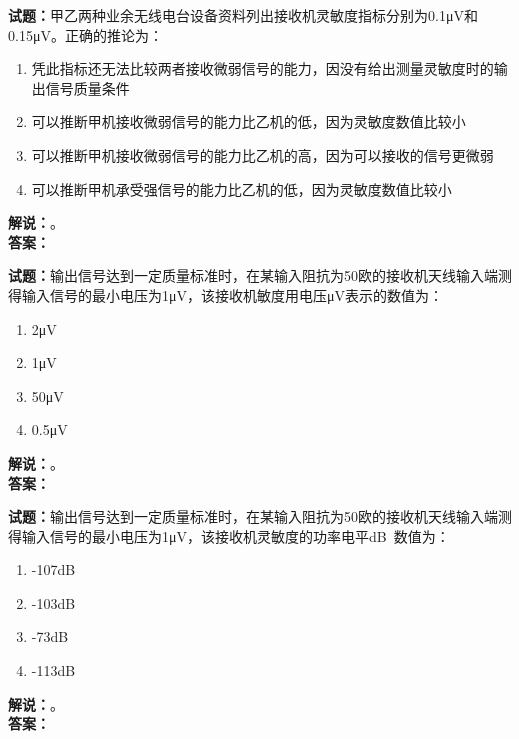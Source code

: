 \documentclass{ctexbook}
\begin{document}
\vspace{\baselineskip}

\noindent\textbf{试题：}甲乙两种业余无线电台设备资料列出接收机灵敏度指标分别为0.1μV和0.15μV。正确的推论为：
\begin{enumerate}[leftmargin=3em]
  \item 凭此指标还无法比较两者接收微弱信号的能力，因没有给出测量灵敏度时的输出信号质量条件
  \item 可以推断甲机接收微弱信号的能力比乙机的低，因为灵敏度数值比较小
  \item 可以推断甲机接收微弱信号的能力比乙机的高，因为可以接收的信号更微弱
  \item 可以推断甲机承受强信号的能力比乙机的低，因为灵敏度数值比较小
\end{enumerate}
\noindent\textbf{解说：}\textbf{}。\\\noindent\textbf{答案：}

\vspace{\baselineskip}

\noindent\textbf{试题：}输出信号达到一定质量标准时，在某输入阻抗为50欧的接收机天线输入端测得输入信号的最小电压为1μV，该接收机敏度用电压μV表示的数值为：
\begin{enumerate}[leftmargin=3em]
  \item 2μV
  \item 1μV
  \item 50μV
  \item 0.5μV
\end{enumerate}
\noindent\textbf{解说：}\textbf{}。\\\noindent\textbf{答案：}

\vspace{\baselineskip}

\noindent\textbf{试题：}输出信号达到一定质量标准时，在某输入阻抗为50欧的接收机天线输入端测得输入信号的最小电压为1μV，该接收机灵敏度的功率电平\unit[qualifier-mode=combine]{\deci\bel{}}数值为：
\begin{enumerate}[leftmargin=3em]
  \item -107\unit[qualifier-mode=combine]{\deci\bel{}}
  \item -103\unit[qualifier-mode=combine]{\deci\bel{}}
  \item -73\unit[qualifier-mode=combine]{\deci\bel{}}
  \item -113\unit[qualifier-mode=combine]{\deci\bel{}}
\end{enumerate}
\noindent\textbf{解说：}\textbf{}。\\\noindent\textbf{答案：}
\end{document}
